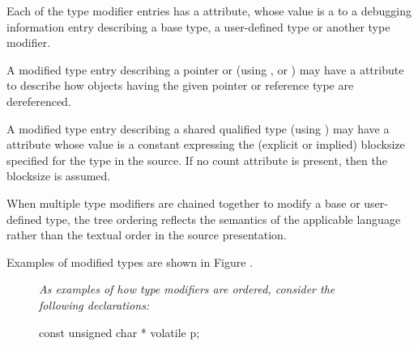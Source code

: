 {Each of the type modifier entries has a 
\DWATtype{} attribute,
whose value is a  
to a debugging information entry
describing a base type, a user-defined type or another type
modifier.

A modified type entry describing a 
pointer or 
(using \DWTAGpointertype,
\DWTAGreferencetype{} or
\DWTAGrvaluereferencetype) 
may have
a\hypertarget{chap:DWATadressclasspointerorreferencetypes}{}
\DWATaddressclassDEFN{} 
attribute to describe how objects having the given pointer
or reference type are dereferenced.

A modified type entry describing a  shared qualified type
(using \DWTAGsharedtype) may have a
\DWATcount{} attribute
whose value is a constant expressing the (explicit or implied) blocksize specified for the
type in the source. If no count attribute is present, then the 
blocksize is assumed.

When multiple type modifiers are chained together to modify
a base or user-defined type, the tree ordering reflects the
semantics of the 
applicable language 
rather 
than 
the 
textual
order 
in 
the 
source 
presentation.

Examples of modified types are shown in Figure .

\begin{figure}[t]
\textit{As examples of how type modifiers are ordered, consider the following
 declarations:}
\par %
\begin{nlnlisting}
    const unsigned char * volatile p;
\end{nlnlisting}


\end{figure}}
